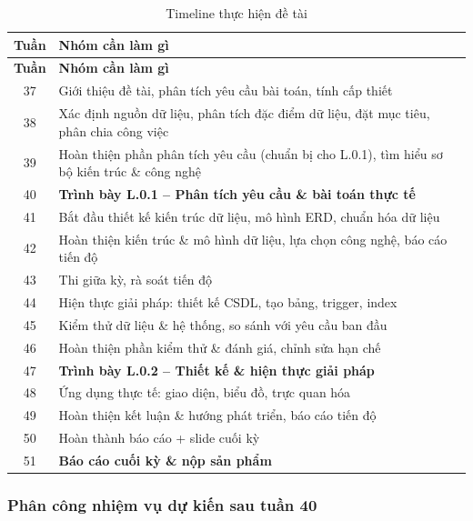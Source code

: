 \documentclass{../hcmut-report}
\begin{document}
\begin{longtable}{|c|p{11cm}|}
\caption{Timeline thực hiện đề tài} \\
\hline
\textbf{Tuần} & \textbf{Nhóm cần làm gì} \\
\hline
\endfirsthead

\hline
\textbf{Tuần} & \textbf{Nhóm cần làm gì} \\
\hline
\endhead

\hline
\endfoot

\hline
\endlastfoot

37 & Giới thiệu đề tài, phân tích yêu cầu bài toán, tính cấp thiết \\ \hline
38 & Xác định nguồn dữ liệu, phân tích đặc điểm dữ liệu, đặt mục tiêu, phân chia công việc \\ \hline
39 & Hoàn thiện phần phân tích yêu cầu (chuẩn bị cho L.0.1), tìm hiểu sơ bộ kiến trúc \& công nghệ \\ \hline
40 & \textbf{Trình bày L.0.1 – Phân tích yêu cầu \& bài toán thực tế} \\ \hline
41 & Bắt đầu thiết kế kiến trúc dữ liệu, mô hình ERD, chuẩn hóa dữ liệu \\ \hline
42 & Hoàn thiện kiến trúc \& mô hình dữ liệu, lựa chọn công nghệ, báo cáo tiến độ \\ \hline
43 & Thi giữa kỳ, rà soát tiến độ \\ \hline
44 & Hiện thực giải pháp: thiết kế CSDL, tạo bảng, trigger, index \\ \hline
45 & Kiểm thử dữ liệu \& hệ thống, so sánh với yêu cầu ban đầu \\ \hline
46 & Hoàn thiện phần kiểm thử \& đánh giá, chỉnh sửa hạn chế \\ \hline
47 & \textbf{Trình bày L.0.2 – Thiết kế \& hiện thực giải pháp} \\ \hline
48 & Ứng dụng thực tế: giao diện, biểu đồ, trực quan hóa \\ \hline
49 & Hoàn thiện kết luận \& hướng phát triển, báo cáo tiến độ \\ \hline
50 & Hoàn thành báo cáo + slide cuối kỳ \\ \hline
51 & \textbf{Báo cáo cuối kỳ \& nộp sản phẩm} \\ \hline

\end{longtable}


\subsubsection{Phân công nhiệm vụ dự kiến sau tuần 40}
\end{document}
